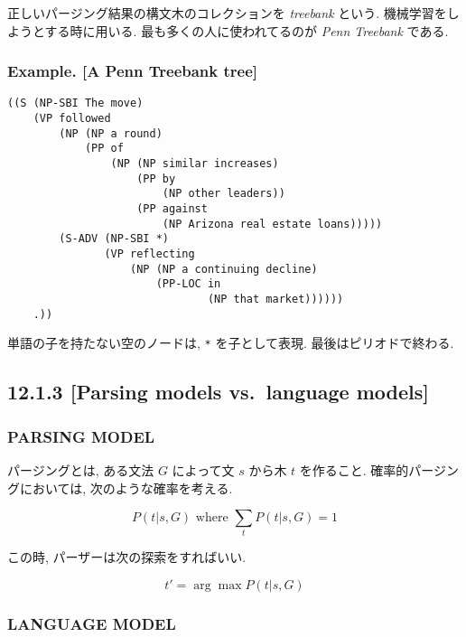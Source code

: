 \documentclass{beamer}
\begin{document}
\begin{frame}
正しいパージング結果の構文木のコレクションを \emph{treebank} という. 
機械学習をしようとする時に用いる.  最も多くの人に使われてるのが
\emph{Penn Treebank} である. 
\end{frame}

\subsubsection{Example. {[}A Penn Treebank tree{]}}

\begin{frame}[fragile]
\begin{verbatim}
((S (NP-SBI The move)
    (VP followed
        (NP (NP a round)
            (PP of
                (NP (NP similar increases)
                    (PP by
                        (NP other leaders))
                    (PP against
                        (NP Arizona real estate loans)))))
        (S-ADV (NP-SBI *)
               (VP reflecting
                   (NP (NP a continuing decline)
                       (PP-LOC in
                               (NP that market))))))
    .))
\end{verbatim}

単語の子を持たない空のノードは, \texttt{*}
を子として表現. 最後はピリオドで終わる. 
\end{frame}

\subsection{12.1.3 {[}Parsing models vs.~language models{]}}

\subsubsection{PARSING MODEL}

\begin{frame}
パージングとは, ある文法 $G$ によって文 $s$ から木 $t$ を作ること. 
確率的パージングにおいては, 次のような確率を考える. 

\[ P(t \vert  s, G) \textrm{~where~} \sum_t P(t \vert  s, G) = 1 \]

この時, パーザーは次の探索をすればいい. 

\[ t' = \arg \max P(t \vert  s, G) \]
\end{frame}

\subsubsection{LANGUAGE MODEL}
\end{document}
